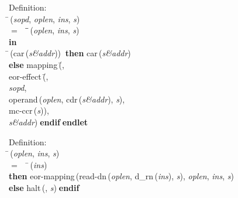 \begin{tabbing}{\sc Definition}: \\  
\=\,({\it{sopd\/}}, {\it{oplen\/}}, {\it{ins\/}}, {\it{s\/}}) \\ 
$=$$\;\;\;\;$\=\=\,({\it{oplen\/}}, {\it{ins\/}}, {\it{s\/}})\- \\ 
{\bf in} \\ 
\=\,({\rm{car}}\,({\it{s\&addr\/}}))$\;\;${\bf then }{\rm{car}}\,({\it{s\&addr\/}}) \\ 
{\bf else }{\rm{mapping}}\,(\=, \\ 
{\rm{eor-effect}}\,(\=, \\ 
{\it{sopd\/}}, \\ 
{\rm{operand}}\,({\it{oplen\/}}, {\rm{cdr}}\,({\it{s\&addr\/}}), {\it{s\/}}), \\ 
{\rm{mc-ccr}}\,({\it{s\/}}))\-, \\ 
{\it{s\&addr\/}})\-$\;${\bf  endif}\-$\;${\bf  endlet}\-\-
\end{tabbing}

\begin{tabbing}{\sc Definition}: \\  
\=\,({\it{oplen\/}}, {\it{ins\/}}, {\it{s\/}}) \\ 
$=$$\;\;\;\;$\=\,({\it{ins\/}}) \\ 
{\bf then }{\rm{eor-mapping}}\,({\rm{read-dn}}\,({\it{oplen\/}}, {\rm{d\_rn}}\,({\it{ins\/}}), {\it{s\/}}), {\it{oplen\/}}, {\it{ins\/}}, {\it{s\/}}) \\ 
{\bf else }{\rm{halt}}\,({}, {\it{s\/}})$\;${\bf  endif}\-\-
\end{tabbing}


